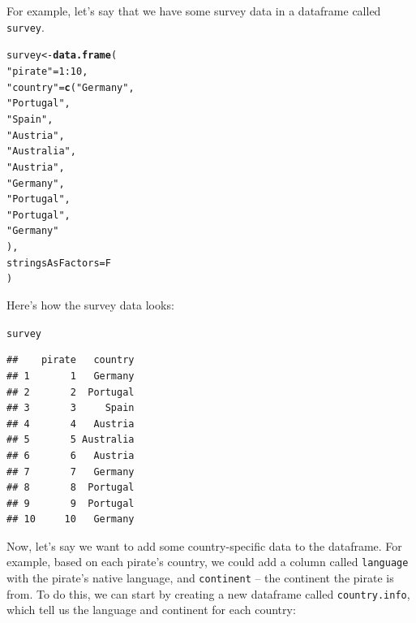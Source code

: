 \documentclass{tufte-book}\usepackage[]{graphicx}\usepackage[]{color}
\makeatletter
\newcommand{\hlnum}[1]{\textcolor[rgb]{0.686,0.059,0.569}{#1}}%
\newcommand{\hlstr}[1]{\textcolor[rgb]{0.192,0.494,0.8}{#1}}%
\newcommand{\hlopt}[1]{\textcolor[rgb]{0,0,0}{#1}}%
\newcommand{\hlstd}[1]{\textcolor[rgb]{0.345,0.345,0.345}{#1}}%
\newcommand{\hlkwb}[1]{\textcolor[rgb]{0.69,0.353,0.396}{#1}}%
\newcommand{\hlkwc}[1]{\textcolor[rgb]{0.333,0.667,0.333}{#1}}%
\newcommand{\hlkwd}[1]{\textcolor[rgb]{0.737,0.353,0.396}{\textbf{#1}}}%
\newenvironment{kframe}{%
 \def\at@end@of@kframe{}%
 \ifinner\ifhmode%
  \def\at@end@of@kframe{\end{minipage}}%
  \begin{minipage}{\columnwidth}%
 \fi\fi%
 \def\FrameCommand##1{\hskip\@totalleftmargin \hskip-\fboxsep
 \colorbox{shadecolor}{##1}\hskip-\fboxsep
     \hskip-\linewidth \hskip-\@totalleftmargin \hskip\columnwidth}%
 \MakeFramed {\advance\hsize-\width
   \@totalleftmargin\z@ \linewidth\hsize
   \@setminipage}}%
 {\par\unskip\endMakeFramed%
 \at@end@of@kframe}
\newenvironment{knitrout}{}{} %
\makeatother
\begin{document}
For example, let's say that we have some survey data in a dataframe called \texttt{survey}.

\begin{marginfigure}
\begin{knitrout}
\color{fgcolor}\begin{kframe}
\begin{alltt}
\hlstd{survey} \hlkwb{<-} \hlkwd{data.frame}\hlstd{(}
  \hlstr{"pirate"} \hlstd{=} \hlnum{1}\hlopt{:}\hlnum{10}\hlstd{,}
  \hlstr{"country"} \hlstd{=} \hlkwd{c}\hlstd{(}\hlstr{"Germany"}\hlstd{,}
               \hlstr{"Portugal"}\hlstd{,}
               \hlstr{"Spain"}\hlstd{,}
               \hlstr{"Austria"}\hlstd{,}
               \hlstr{"Australia"}\hlstd{,}
               \hlstr{"Austria"}\hlstd{,}
               \hlstr{"Germany"}\hlstd{,}
               \hlstr{"Portugal"}\hlstd{,}
               \hlstr{"Portugal"}\hlstd{,}
               \hlstr{"Germany"}
               \hlstd{),}
  \hlkwc{stringsAsFactors} \hlstd{= F}
\hlstd{)}
\end{alltt}
\end{kframe}
\end{knitrout}
\end{marginfigure}

Here's how the survey data looks:
\begin{knitrout}
\color{fgcolor}\begin{kframe}
\begin{alltt}
\hlstd{survey}
\end{alltt}
\begin{verbatim}
##    pirate   country
## 1       1   Germany
## 2       2  Portugal
## 3       3     Spain
## 4       4   Austria
## 5       5 Australia
## 6       6   Austria
## 7       7   Germany
## 8       8  Portugal
## 9       9  Portugal
## 10     10   Germany
\end{verbatim}
\end{kframe}
\end{knitrout}


Now, let's say we want to add some country-specific data to the dataframe. For example, based on each pirate's country, we could add a column called \texttt{language} with the pirate's native language, and \texttt{continent} -- the continent the pirate is from. To do this, we can start by creating a new dataframe called \texttt{country.info}, which tell us the language and continent for each country:
\end{document}
